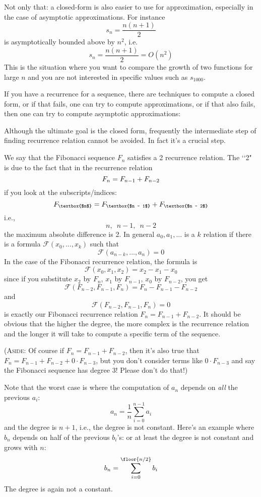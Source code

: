 Not only that:
a closed-form is also easier to use for approximation,
especially in the case of asymptotic approximations.
For instance
\[
s_n = \frac{n(n+1)}{2}
\]
is asymptotically bounded above by $n^2$, i.e.
\[
s_n = \frac{n(n+1)}{2} = O(n^2)
\]
This is the situation where you want to compare the growth of two
functions for large $n$ and you are not interested in 
specific values such as $s_{1000}$.

If you have a recurrence for a sequence, there are techniques to
compute a closed form, or if that fails, one can try to
compute approximations, or if that also fails, then one can try to
compute asymptotic approximations:



Although the ultimate goal is the closed form, frequently the
intermediate step of finding recurrence relation cannot be avoided.
In fact it's a crucial step.

We say that the Fibonacci sequence
$F_n$ satisfies a  2 recurrence relation.
The \lq\lq 2" is due to the fact that in the recurrence relation
\[
F_n = F_{n-1} + F_{n-2} \\
\]
if you look at the subscripts/indices:
\[
F_{\text{\textbox{$n$}}} = F_{\text{\textbox{$n - 1$}}} + F_{\text{\textbox{$n - 2$}}} 
\]
i.e.,
\[
n, \,\,\, n-1, \,\,\, n-2
\]
the maximum absolute difference is 2.
In general $a_0, a_1, ...$ is a  $k$ relation if there is a
formula ${\mathcal F}(x_0, ..., x_{k})$ such that
\[
{\mathcal F}(a_{n-k}, ..., a_{n}) = 0
\]
In the case of the Fibonacci recurrence relation,
the formula is
\[
  {\mathcal F}(x_0, x_1, x_2) = x_2 - x_1 - x_0
  \]
since if you
substitute
$x_2$ by $F_n$, 
$x_1$ by $F_{n-1}$, 
$x_0$ by $F_{n-2}$,
you get
\[
  {\mathcal F}(F_{n-2}, F_{n-1}, F_{n}) = F_n - F_{n-1} - F_{n-2}
\]
and
\[
  {\mathcal F}(F_{n-2}, F_{n-1}, F_{n}) = 0
  \]
is exactly our Fibonacci recurrence relation
$F_n = F_{n-1} + F_{n-2}$.
It should be obvious that the higher the degree, the more complex
is the recurrence relation and the longer it will take
to compute a specific term of the sequence.

(\textsc{Aside}: Of course if 
$F_n = F_{n-1} + F_{n-2}$, then
it's also true that
$F_n = F_{n-1} + F_{n-2} + 0 \cdot F_{n-3}$, but you don't
consider terms like $0 \cdot F_{n-3}$ and say the Fibonacci
sequence has degree $3$! Please don't do that!)

Note that the worst case is where the computation of
$a_n$ depends on \textit{all} the previous $a_i$:
\[
a_n = \frac{1}{n} \sum_{i = 0}^{n-1} a_i
\]
and the degree is $n + 1$, i.e., the degree is not constant.
Here's an example where $b_n$ depends on half of the previous
$b_i$'s:
or at least the degree is not constant and grows with $n$:
\[
b_n = \sum_{i = 0}^{\floor{n/2}} b_i
\]
The degree is again not a constant.

